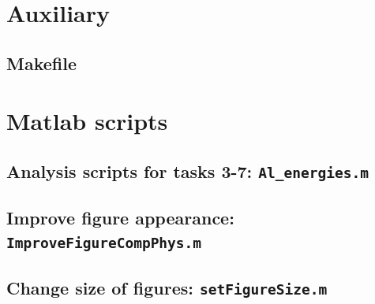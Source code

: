 \section{Auxiliary }
\subsection{Makefile}




\section{Matlab scripts}
\subsection{Analysis scripts for tasks 3-7: \texttt{Al\_energies.m}}


\subsection{Improve figure appearance: \texttt{ImproveFigureCompPhys.m}}


\subsection{Change size of figures: \texttt{setFigureSize.m}}



